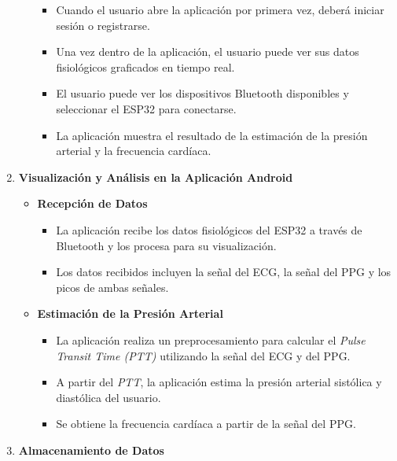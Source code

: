 \begin{enumerate}
\begin{itemize}
                    \begin{itemize}
                        \item Cuando el usuario abre la aplicación por primera vez, deberá iniciar sesión o registrarse.
                        \item Una vez dentro de la aplicación, el usuario puede ver sus datos fisiológicos graficados en tiempo real.
                        \item El usuario puede ver los dispositivos Bluetooth disponibles y seleccionar el ESP32 para conectarse.
                        \item La aplicación muestra el resultado de la estimación de la presión arterial y la frecuencia cardíaca.
                    \end{itemize}
            \end{itemize}
        \item \textbf{Visualización y Análisis en la Aplicación Android}
            \begin{itemize}
                \item \textbf{Recepción de Datos}
                    \begin{itemize}
                        \item La aplicación recibe los datos fisiológicos del ESP32 a través de Bluetooth y los procesa para su visualización.
                        \item Los datos recibidos incluyen la señal del ECG, la señal del PPG y los picos de ambas señales.
                    \end{itemize}
                \item \textbf{Estimación de la Presión Arterial}
                    \begin{itemize}
                        \item La aplicación realiza un preprocesamiento para calcular el \textit{Pulse Transit Time (PTT)} utilizando la señal del ECG y del PPG.
                        \item A partir del \textit{PTT}, la aplicación estima la presión arterial sistólica y diastólica del usuario.
                        \item Se obtiene la frecuencia cardíaca a partir de la señal del PPG.
                    \end{itemize}
            \end{itemize}
        \item \textbf{Almacenamiento de Datos}
            \begin{itemize}

\end{itemize}
\end{enumerate}
